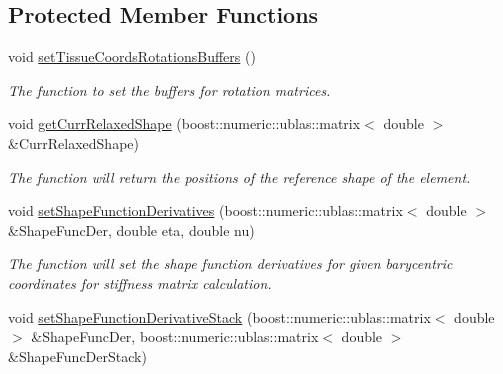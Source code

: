 \subsection*{Protected Member Functions}
\begin{DoxyCompactItemize}
\item 
\hypertarget{classTriangle_abc90c3548a0f08e5d1a34ad42748622a}{}void \hyperlink{classTriangle_abc90c3548a0f08e5d1a34ad42748622a}{set\+Tissue\+Coords\+Rotations\+Buffers} ()\label{classTriangle_abc90c3548a0f08e5d1a34ad42748622a}

\begin{DoxyCompactList}\small\item\em The function to set the buffers for rotation matrices. \end{DoxyCompactList}\item 
\hypertarget{classTriangle_a4c0e797b1552945c68f0b76cfe939a06}{}void \hyperlink{classTriangle_a4c0e797b1552945c68f0b76cfe939a06}{get\+Curr\+Relaxed\+Shape} (boost\+::numeric\+::ublas\+::matrix$<$ double $>$ \&Curr\+Relaxed\+Shape)\label{classTriangle_a4c0e797b1552945c68f0b76cfe939a06}

\begin{DoxyCompactList}\small\item\em The function will return the positions of the reference shape of the element. \end{DoxyCompactList}\item 
\hypertarget{classTriangle_ae226791c33e27f0152bf71dda61dfd81}{}void \hyperlink{classTriangle_ae226791c33e27f0152bf71dda61dfd81}{set\+Shape\+Function\+Derivatives} (boost\+::numeric\+::ublas\+::matrix$<$ double $>$ \&Shape\+Func\+Der, double eta, double nu)\label{classTriangle_ae226791c33e27f0152bf71dda61dfd81}

\begin{DoxyCompactList}\small\item\em The function will set the shape function derivatives for given barycentric coordinates for stiffness matrix calculation. \end{DoxyCompactList}\item 
\hypertarget{classTriangle_a96981bb576f1a27d29cd26ae42b99f7b}{}void \hyperlink{classTriangle_a96981bb576f1a27d29cd26ae42b99f7b}{set\+Shape\+Function\+Derivative\+Stack} (boost\+::numeric\+::ublas\+::matrix$<$ double $>$ \&Shape\+Func\+Der, boost\+::numeric\+::ublas\+::matrix$<$ double $>$ \&Shape\+Func\+Der\+Stack)\label{classTriangle_a96981bb576f1a27d29cd26ae42b99f7b}


\end{DoxyCompactItemize}
